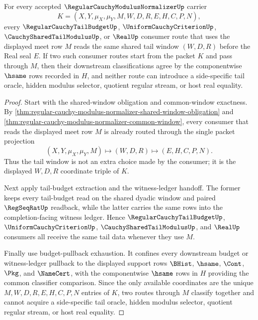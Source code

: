 \begin{theorem}
\label{thm:regular-cauchy-modulus-normalizer-shared-tail-meet-determinacy}
For every accepted $\RegularCauchyModulusNormalizerUp$ carrier
$$
K=(X,Y,\mu_X,\mu_Y,M,W,D,R,E,H,C,P,N),
$$
every $\RegularCauchyTailBudgetUp$, $\UniformCauchyCriterionUp$,
$\CauchySharedTailModulusUp$, or $\RealUp$ consumer route that uses the
displayed meet row $M$ reads the same shared tail window $(W,D,R)$ before the
Real seal $E$. If two such consumer routes start from the packet $K$ and pass
through $M$, then their downstream classifications agree by the componentwise
$\hsame$ rows recorded in $H$, and neither route can introduce a
side-specific tail oracle, hidden modulus selector, quotient regular stream,
or host real equality.
\end{theorem}
\begin{proof}
Start with the shared-window obligation and common-window exactness. By
\autoref{thm:regular-cauchy-modulus-normalizer-shared-window-obligation} and
\autoref{thm:regular-cauchy-modulus-normalizer-common-window}, every consumer
that reads the displayed meet row $M$ is already routed through the single
packet projection
$$
(X,Y,\mu_X,\mu_Y,M)\longmapsto(W,D,R)\longmapsto(E,H,C,P,N).
$$
Thus the tail window is not an extra choice made by the consumer; it is the
displayed $W,D,R$ coordinate triple of $K$.

Next apply tail-budget extraction and the witness-ledger handoff. The former
keeps every tail-budget read on the shared dyadic window and paired
$\RegSeqRatUp$ readback, while the latter carries the same rows into the
completion-facing witness ledger. Hence $\RegularCauchyTailBudgetUp$,
$\UniformCauchyCriterionUp$, $\CauchySharedTailModulusUp$, and $\RealUp$
consumers all receive the same tail data whenever they use $M$.

Finally use budget-pullback exhaustion. It confines every downstream budget or
witness-ledger pullback to the displayed support rows $\BHist$, $\hsame$,
$\Cont$, $\Pkg$, and $\NameCert$, with the componentwise $\hsame$ rows in $H$
providing the common classifier comparison. Since the only available
coordinates are the unique $M,W,D,R,E,H,C,P,N$ entries of $K$, two routes
through $M$ classify together and cannot acquire a side-specific tail oracle,
hidden modulus selector, quotient regular stream, or host real equality.
\end{proof}

